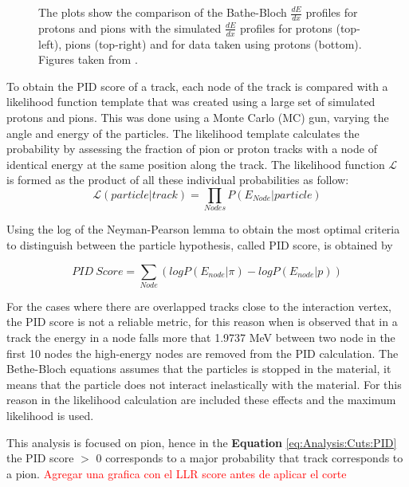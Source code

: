\begin{itemize}
\begin{figure}[!htb]
        \caption{The plots show the comparison of the Bathe-Bloch $\frac{dE}{dx}$ profiles for protons and pions with the simulated $\frac{dE}{dx}$ profiles for protons (top-left), pions (top-right) and for data taken using protons (bottom). Figures taken from \cite{ALIAGA2014130}.}
        \label{fig:Analysis:DataSelection:Cuts:dEdXBetheProfiles}
    \end{figure}

    To obtain the PID score of a track, each node of the track is compared with a likelihood function template that was created using a large set of simulated protons and pions. This was done using a Monte Carlo (MC) gun, varying the angle and energy of the particles. The likelihood template calculates the probability by assessing the fraction of pion or proton tracks with a node of identical energy at the same position along the track. The likelihood function $\mathcal{L}$ is formed as the product of all these individual probabilities as follow:
    \begin{equation}
        \mathcal{L}\left(particle|track\right)=\prod_{Nodes}P\left(E_{Node}|particle\right)
    \end{equation}

    Using the log of the Neyman-Pearson lemma \cite{Neyman-Pearson} to obtain the most optimal criteria to distinguish between the particle hypothesis, called PID score, is obtained by

    \begin{equation}
        PID\ Score = \sum_{Node} (logP(E_{node}|\pi)-logP(E_{node}|p))
        \label{eq:Analysis:Cuts:PID}
    \end{equation}

    For the cases where there are overlapped tracks close to the interaction vertex, the PID score is not a reliable metric, for this reason when is observed that in a track the energy in a node falls more that 1.9737 MeV between two node in the first 10 nodes the high-energy nodes are removed from the PID calculation. The Bethe-Bloch equations assumes that the particles is stopped in the material, it means that the particle does not interact inelastically with the material. For this reason in the likelihood calculation are included these effects and the maximum likelihood is used. 

    This analysis is focused on pion, hence in the \textbf{Equation} \ref{eq:Analysis:Cuts:PID} the PID score $>$ 0 corresponds to a major probability that track corresponds to a pion. \textcolor{red}{Agregar una grafica con el LLR score antes de aplicar el corte}


\end{itemize}
